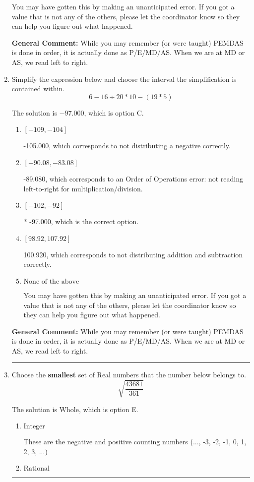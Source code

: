 \documentclass{extbook}[14pt]
\newcommand{\litem}[1]{\item #1

\rule{\textwidth}{0.4pt}}
\begin{document}
\begin{enumerate}
{\begin{enumerate}[label=\Alph*.]
 You may have gotten this by making an unanticipated error. If you got a value that is not any of the others, please let the coordinator know so they can help you figure out what happened.
\end{enumerate}

\textbf{General Comment:} While you may remember (or were taught) PEMDAS is done in order, it is actually done as P/E/MD/AS. When we are at MD or AS, we read left to right.
}
\litem{
Simplify the expression below and choose the interval the simplification is contained within.
\[ 6 - 16 \div 20 * 10 - (19 * 5) \]

The solution is \( -97.000 \), which is option C.\begin{enumerate}[label=\Alph*.]
\item \( [-109, -104] \)

 -105.000, which corresponds to not distributing a negative correctly.
\item \( [-90.08, -83.08] \)

 -89.080, which corresponds to an Order of Operations error: not reading left-to-right for multiplication/division.
\item \( [-102, -92] \)

* -97.000, which is the correct option.
\item \( [98.92, 107.92] \)

 100.920, which corresponds to not distributing addition and subtraction correctly.
\item \( \text{None of the above} \)

 You may have gotten this by making an unanticipated error. If you got a value that is not any of the others, please let the coordinator know so they can help you figure out what happened.
\end{enumerate}

\textbf{General Comment:} While you may remember (or were taught) PEMDAS is done in order, it is actually done as P/E/MD/AS. When we are at MD or AS, we read left to right.
}
\litem{
Choose the \textbf{smallest} set of Real numbers that the number below belongs to.
\[ \sqrt{\frac{43681}{361}} \]

The solution is \( \text{Whole} \), which is option E.\begin{enumerate}[label=\Alph*.]
\item \( \text{Integer} \)

These are the negative and positive counting numbers (..., -3, -2, -1, 0, 1, 2, 3, ...)
\item \( \text{Rational} \)


\end{enumerate}}
\end{enumerate}
\end{document}
